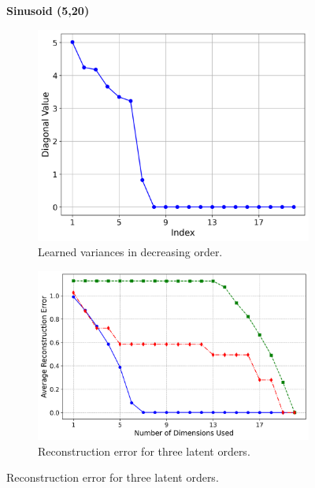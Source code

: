 \begin{figure}[t!]
            \vspace{1.5em} %
            
            \textbf{Sinusoid (5,20)} \par\medskip
            
            \begin{subfigure}[b]{0.440\textwidth}
                \centering
                \includegraphics[width=\textwidth]{chapter5/results/visualisations/RAE/reconstruction/sinusoid_5_20/diagonal_values_normal_scale.png}
                \caption{Learned variances in decreasing order.}
                \label{fig:sinusoid_variances}
            \end{subfigure}
            \hfill
            \begin{subfigure}[b]{0.549\textwidth}
                \centering
                \includegraphics[width=\textwidth]{chapter5/results/visualisations/RAE/reconstruction/sinusoid_5_20/reconstruction_error_plot_normal_scale.png}
                \caption{Reconstruction error for three latent orders.}
                \label{fig:sinusoid_reconstruction_errors}
            \end{subfigure}
        

\end{figure}
